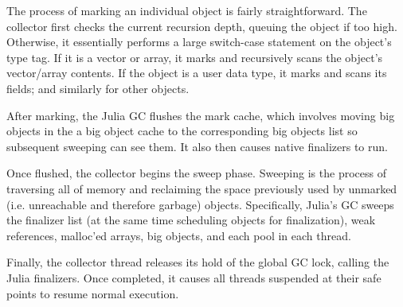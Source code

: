 The process of marking an individual object is fairly straightforward.
The collector first checks the current recursion depth, queuing the object if too high.
Otherwise, it essentially performs a large switch-case statement on the object's type tag.
If it is a vector or array, it marks and recursively scans the object's vector/array contents.
If the object is a user data type, it marks and scans its fields; and similarly for other objects.

After marking, the Julia GC flushes the mark cache, which involves moving big objects in the a big object cache to the corresponding big objects list so subsequent sweeping can see them.
It also then causes native finalizers to run.

Once flushed, the collector begins the sweep phase.
Sweeping is the process of traversing all of memory and reclaiming the space previously used by unmarked (i.e. unreachable and therefore garbage) objects.
Specifically, Julia's GC sweeps the finalizer list (at the same time scheduling objects for finalization), weak references, malloc'ed arrays, big objects, and each pool in each thread.

Finally, the collector thread releases its hold of the global GC lock, calling the Julia finalizers.
Once completed, it causes all threads suspended at their safe points to resume normal execution.


